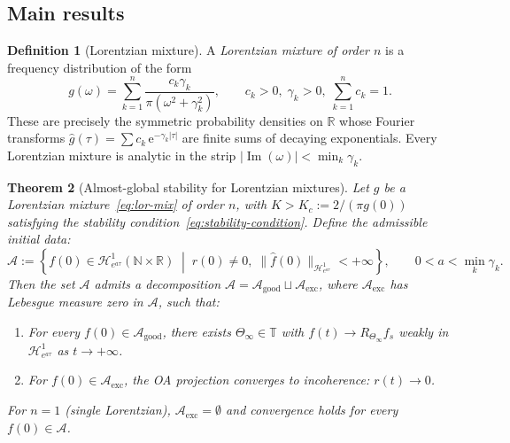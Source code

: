 \documentclass[11pt,a4paper]{article}
\newtheorem{theorem}{Theorem}[section]
\theoremstyle{definition}
\newtheorem{definition}[theorem]{Definition}
\DeclareMathOperator{\im}{Im}
\newcommand{\R}{\mathbb{R}}
\newcommand{\N}{\mathbb{N}}
\newcommand{\T}{\mathbb{T}}
\begin{document}
\subsection{Main results}

\begin{definition}[Lorentzian mixture]\label{def:lor-mix}
A \emph{Lorentzian mixture of order $n$} is a frequency distribution of the form
\begin{equation}\label{eq:lor-mix}
g(\omega) = \sum_{k=1}^n \frac{c_k\gamma_k}{\pi(\omega^2 + \gamma_k^2)}, \qquad c_k > 0,\;\gamma_k > 0,\;\sum_{k=1}^n c_k = 1.
\end{equation}
These are precisely the symmetric probability densities on $\R$ whose Fourier transforms $\hat{g}(\tau) = \sum c_k\,\mathrm{e}^{-\gamma_k|\tau|}$ are finite sums of decaying exponentials. Every Lorentzian mixture is analytic in the strip $|\im(\omega)| < \min_k\gamma_k$.
\end{definition}

\begin{theorem}[Almost-global stability for Lorentzian mixtures]\label{thm:main-rational}
Let $g$ be a Lorentzian mixture~\eqref{eq:lor-mix} of order $n$, with $K > K_c := 2/(\pi g(0))$ satisfying the stability condition~\eqref{eq:stability-condition}. Define the \emph{admissible initial data}:
\[
\mathcal{A} := \left\{f(0) \in \mathcal{H}^1_{e^{a\tau}}(\N \times \R) \;\middle|\; r(0) \neq 0,\; \|\hat{f}(0)\|_{\mathcal{H}^1_{e^{a\tau}}} < +\infty \right\}, \qquad 0 < a < \min_k\gamma_k.
\]
Then the set $\mathcal{A}$ admits a decomposition $\mathcal{A} = \mathcal{A}_{\mathrm{good}} \sqcup \mathcal{A}_{\mathrm{exc}}$, where $\mathcal{A}_{\mathrm{exc}}$ has Lebesgue measure zero in $\mathcal{A}$, such that:
\begin{enumerate}[label=(\alph*)]
\item For every $f(0) \in \mathcal{A}_{\mathrm{good}}$, there exists $\Theta_\infty \in \T$ with $f(t) \to R_{\Theta_\infty} f_s$ weakly in $\mathcal{H}^1_{e^{a\tau}}$ as $t \to +\infty$.
\item For $f(0) \in \mathcal{A}_{\mathrm{exc}}$, the OA projection converges to incoherence: $r(t) \to 0$.
\end{enumerate}
For $n = 1$ (single Lorentzian), $\mathcal{A}_{\mathrm{exc}} = \emptyset$ and convergence holds for \emph{every} $f(0) \in \mathcal{A}$.
\end{theorem}
\end{document}
